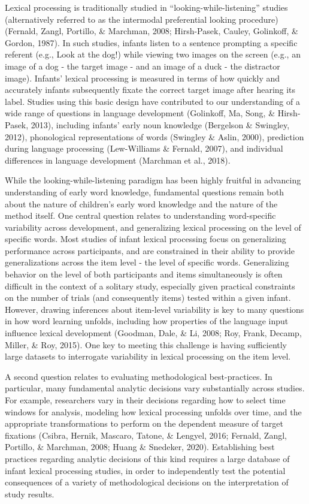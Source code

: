 \documentclass[10pt, letterpaper]{article}
\begin{document}
Lexical processing is traditionally studied in
``looking-while-listening'' studies (alternatively referred to as the
intermodal preferential looking procedure) (Fernald, Zangl, Portillo, \&
Marchman, 2008; Hirsh-Pasek, Cauley, Golinkoff, \& Gordon, 1987). In
such studies, infants listen to a sentence prompting a specific referent
(e.g., Look at the dog!) while viewing two images on the screen (e.g.,
an image of a dog - the target image - and an image of a duck - the
distractor image). Infants' lexical processing is measured in terms of
how quickly and accurately infants subsequently fixate the correct
target image after hearing its label. Studies using this basic design
have contributed to our understanding of a wide range of questions in
language development (Golinkoff, Ma, Song, \& Hirsh-Pasek, 2013),
including infants' early noun knowledge (Bergelson \& Swingley, 2012),
phonological representations of words (Swingley \& Aslin, 2000),
prediction during language processing (Lew-Williams \& Fernald, 2007),
and individual differences in language development (Marchman et al.,
2018).

While the looking-while-listening paradigm has been highly fruitful in
advancing understanding of early word knowledge, fundamental questions
remain both about the nature of children's early word knowledge and the
nature of the method itself. One central question relates to
understanding word-specific variability across development, and
generalizing lexical processing on the level of specific words. Most
studies of infant lexical processing focus on generalizing performance
across participants, and are constrained in their ability to provide
generalizations across the item level - the level of specific words.
Generalizing behavior on the level of both participants and items
simultaneously is often difficult in the context of a solitary study,
especially given practical constraints on the number of trials (and
consequently items) tested within a given infant. However, drawing
inferences about item-level variability is key to many questions in how
word learning unfolds, including how properties of the language input
influence lexical development (Goodman, Dale, \& Li, 2008; Roy, Frank,
Decamp, Miller, \& Roy, 2015). One key to meeting this challenge is
having sufficiently large datasets to interrogate variability in lexical
processing on the item level.

A second question relates to evaluating methodological best-practices.
In particular, many fundamental analytic decisions vary substantially
across studies. For example, researchers vary in their decisions
regarding how to select time windows for analysis, modeling how lexical
processing unfolds over time, and the appropriate transformations to
perform on the dependent measure of target fixations (Csibra, Hernik,
Mascaro, Tatone, \& Lengyel, 2016; Fernald, Zangl, Portillo, \&
Marchman, 2008; Huang \& Snedeker, 2020). Establishing best practices
regarding analytic decisions of this kind requires a large database of
infant lexical processing studies, in order to independently test the
potential consequences of a variety of methodological decisions on the
interpretation of study results.
\end{document}
